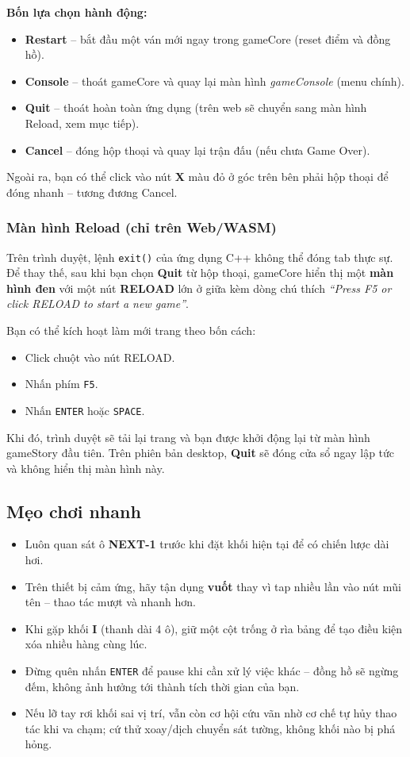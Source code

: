 \documentclass[12pt,a4paper]{article}
\begin{document}
\noindent\textbf{Bốn lựa chọn hành động:}
\begin{itemize}
    \item \textbf{Restart} -- bắt đầu một ván mới ngay trong gameCore (reset điểm và đồng hồ).
    \item \textbf{Console} -- thoát gameCore và quay lại màn hình \textit{gameConsole} (menu chính).
    \item \textbf{Quit} -- thoát hoàn toàn ứng dụng (trên web sẽ chuyển sang màn hình Reload, xem mục tiếp).
    \item \textbf{Cancel} -- đóng hộp thoại và quay lại trận đấu (nếu chưa Game Over).
\end{itemize}
Ngoài ra, bạn có thể click vào nút \textbf{X} màu đỏ ở góc trên bên phải hộp thoại để đóng nhanh -- tương đương Cancel.

\subsubsection{Màn hình Reload (chỉ trên Web/WASM)}
Trên trình duyệt, lệnh \texttt{exit()} của ứng dụng C++ không thể đóng tab thực sự. Để thay thế, sau khi bạn chọn \textbf{Quit} từ hộp thoại, gameCore hiển thị một \textbf{màn hình đen} với một nút \textbf{RELOAD} lớn ở giữa kèm dòng chú thích \textit{``Press F5 or click RELOAD to start a new game''}.

Bạn có thể kích hoạt làm mới trang theo bốn cách:
\begin{itemize}
    \item Click chuột vào nút RELOAD.
    \item Nhấn phím \texttt{F5}.
    \item Nhấn \texttt{ENTER} hoặc \texttt{SPACE}.
\end{itemize}
Khi đó, trình duyệt sẽ tải lại trang và bạn được khởi động lại từ màn hình gameStory đầu tiên. Trên phiên bản desktop, \textbf{Quit} sẽ đóng cửa sổ ngay lập tức và không hiển thị màn hình này.

\subsection{Mẹo chơi nhanh}
\begin{itemize}
    \item Luôn quan sát ô \textbf{NEXT-1} trước khi đặt khối hiện tại để có chiến lược dài hơi.
    \item Trên thiết bị cảm ứng, hãy tận dụng \textbf{vuốt} thay vì tap nhiều lần vào nút mũi tên -- thao tác mượt và nhanh hơn.
    \item Khi gặp khối \textbf{I} (thanh dài 4 ô), giữ một cột trống ở rìa bảng để tạo điều kiện xóa nhiều hàng cùng lúc.
    \item Đừng quên nhấn \texttt{ENTER} để pause khi cần xử lý việc khác -- đồng hồ sẽ ngừng đếm, không ảnh hưởng tới thành tích thời gian của bạn.
    \item Nếu lỡ tay rơi khối sai vị trí, vẫn còn cơ hội cứu vãn nhờ cơ chế tự hủy thao tác khi va chạm; cứ thử xoay/dịch chuyển sát tường, không khối nào bị phá hỏng.
\end{itemize}

\label{LastPageGameCoreGuide}
\end{document}
